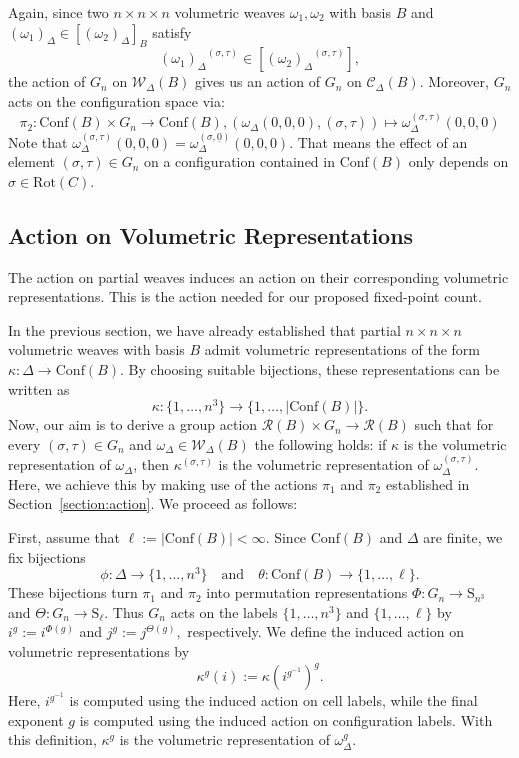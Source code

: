 \documentclass[12pt]{article}
\theoremstyle{definition}
\theoremstyle{remark}
\begin{document}
 
 
 Again, since two $n\times n\times n$ volumetric weaves $\omega_1,\omega_2$ with basis $B$ and $(\omega_1)_{\Delta}\in [(\omega_2)_{\Delta}]_B$
satisfy $${(\omega_1)_{\Delta}}^{(\sigma,\tau)}\in [{(\omega_2)_{\Delta}}^{(\sigma,\tau)} ],$$ the action of $G_n$ on $\mathcal{W}_{\Delta}(B)$ gives us an action of $G_n$ on $\mathcal{C}_{\Delta}(B).$ Moreover, $G_n$ acts on the configuration space via:
\[
\pi_2:\mathrm{Conf}(B)\times G_n \to \mathrm{Conf}(B), (\omega_\Delta(0,0,0), (\sigma,\tau ))\mapsto  \omega^{(\sigma,\tau)}_\Delta(0,0,0)
\]
Note that $\omega^{(\sigma,\tau)}_\Delta(0,0,0)= \omega^{(\sigma, \underline{0})}_\Delta(0,0,0).$ That means the effect of an element $(\sigma,\tau)\in G_n$ on a configuration contained in $\mathrm{Conf}(B)$ only depends on $\sigma\in \mathrm{Rot}(C).$
\subsection{Action on Volumetric Representations}

The  action on partial weaves induces an action on their corresponding volumetric representations. This is the action needed for our proposed fixed-point count.


In the previous section, we have already established that partial $n\times n\times n$ volumetric weaves with basis $B$ admit volumetric representations of the form $\kappa:\Delta\to \mathrm{Conf}(B).$
By choosing suitable bijections, these representations can be written as $$\kappa:\{1,\ldots, n^3\}\to \{1,\ldots, \vert \mathrm{Conf}(B)\vert \}.$$
Now, our aim is to derive a group action $\mathcal{R}(B)\times G_n\to \mathcal{R}(B)$ such that for every $(\sigma,\tau)\in G_n$ and $\omega_{\Delta}\in \mathcal{W}_{\Delta}(B)$ the following holds: if $\kappa$ is the volumetric representation of  $\omega_\Delta$, then $\kappa^{(\sigma,\tau)}$ is the volumetric representation of  $\omega_\Delta^{(\sigma,\tau)}.$
Here, we achieve this by making use of the actions $\pi_1$ and $\pi_2$ established in Section~\ref{section:action}. We proceed as follows:

First, assume that $\ell:=|\mathrm{Conf}(B)|<\infty$. Since $\mathrm{Conf}(B)$ and $\Delta$ are finite, we fix bijections
\[
 \phi:\Delta \to \{1,\ldots,n^3\}
 \quad\text{and}\quad
 \theta:\mathrm{Conf}(B)\to \{1,\ldots,\ell\}.
\]
These bijections turn $\pi_1$ and $\pi_2$ into permutation representations
$\Phi:G_n\to \mathrm{S}_{n^3}$ and $\Theta:G_n\to \mathrm{S}_{\ell}$.
Thus $G_n$ acts on the labels $\{1,\ldots,n^3\}$ and $\{1,\ldots,\ell\}$ by
$i^g:=i^{\Phi(g)}
$ and $j^g:=j^{\Theta(g)},$ respectively.
We define the induced action on volumetric representations by
\[
\kappa^g(i):=\kappa(i^{g^{-1}})^g.
\]
Here, $i^{g^{-1}}$ is computed using the induced action on cell labels, while the final exponent $g$ is computed using the induced action on configuration labels. With this definition, $\kappa^g$ is the volumetric representation of $\omega_\Delta^g$.
\end{document}
